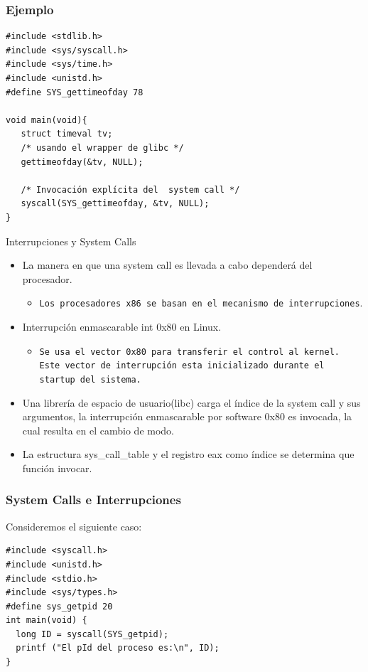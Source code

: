 \begin{frame}[fragile]
\frametitle{Ejemplo}
\begin{lstlisting}
#include <stdlib.h>
#include <sys/syscall.h>
#include <sys/time.h>
#include <unistd.h>
#define SYS_gettimeofday 78

void main(void){
   struct timeval tv;
   /* usando el wrapper de glibc */
   gettimeofday(&tv, NULL);

   /* Invocación explícita del  system call */
   syscall(SYS_gettimeofday, &tv, NULL);
}
\end{lstlisting}
\end{frame}


\begin{frame}{Interrupciones y System Calls}
  \begin{itemize}
    \item La manera en que una system call es llevada a cabo dependerá del procesador.
      \begin{itemize}
	    \item \texttt{Los procesadores x86 se basan en el mecanismo de interrupciones}.
	\end{itemize}  
    
   \item Interrupción enmascarable int 0x80 en Linux.
   \begin{itemize}  
   \item \texttt{Se usa el vector 0x80 para transferir el control al kernel. Este vector de interrupción esta inicializado durante el startup del sistema.}
 \end{itemize}
    \item Una librería de espacio de usuario(libc) carga el índice de la system call y sus argumentos, la interrupción enmascarable por software 	0x80 es invocada, la cual resulta en el cambio de modo.	
   \item La estructura sys\_call\_table y el registro eax como índice se determina que función invocar.	
  \end{itemize}
\end{frame}

\begin{frame}[fragile]
\frametitle{System Calls e Interrupciones}
Consideremos el siguiente caso:
\begin{lstlisting}
#include <syscall.h>
#include <unistd.h>
#include <stdio.h>
#include <sys/types.h>
#define sys_getpid 20
int main(void) {
  long ID = syscall(SYS_getpid);
  printf ("El pId del proceso es:\n", ID);
}
\end{lstlisting}
\end{frame}

